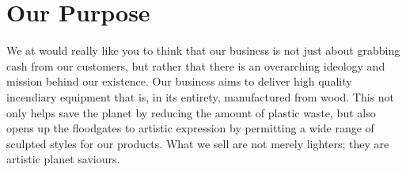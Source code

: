 \section{Our Purpose}
We at {\fw} would really like you to think that our business is not just about grabbing cash from our customers,
but rather that there is an overarching ideology and mission behind our existence.
Our business aims to deliver high quality incendiary equipment that is, in its entirety, manufactured from wood.
This not only helps save the planet by reducing the amount of plastic waste, but also opens up the floodgates to artistic
expression by permitting a wide range of sculpted styles for our products.
What we sell are not merely lighters; they are artistic planet saviours.
